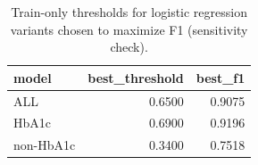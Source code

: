 \begin{table}[H]
\begin{center}
\begin{tabular}{lrr}
\toprule
model & best_threshold & best_f1 \\
\midrule
ALL & 0.6500 & 0.9075 \\
HbA1c & 0.6900 & 0.9196 \\
non-HbA1c & 0.3400 & 0.7518 \\
\bottomrule
\end{tabular}
\end{center}
\vspace{-5pt}
\caption{Train-only thresholds for logistic regression variants chosen to maximize F1 (sensitivity check).}
\label{tab:logit_thresholds_f1_train}
\end{table}
